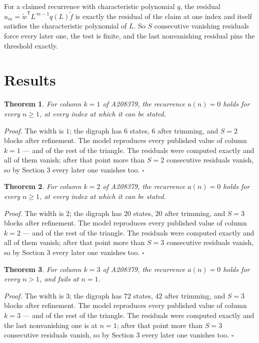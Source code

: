 \documentclass[11pt]{article}
\newtheorem{theorem}{Theorem}
\theoremstyle{definition}
\begin{document}
For a claimed recurrence with characteristic polynomial $q$, the residual $u_m = \tilde w^{\mathsf T}L^{\,m-1}q(L)\tilde f$ is exactly the residual of the claim at one index and itself satisfies the characteristic polynomial of $L$. So $S$ consecutive vanishing residuals force every later one, the test is finite, and the last nonvanishing residual pins the threshold exactly.

\section{Results}

\begin{theorem} For column $k = 1$ of A208379, the recurrence $a(n) = 0$ holds for every $n \ge 1$, at every index at which it can be stated.\end{theorem}

{\itshape Proof.} The width is $1$; the digraph has $6$ states, $6$ after trimming, and $S = 2$ blocks after refinement. The model reproduces every published value of column $k = 1$ --- and of the rest of the triangle. The residuals were computed exactly and all of them vanish; after that point more than $S = 2$ consecutive residuals vanish, so by Section 3 every later one vanishes too. $\square$

\begin{theorem} For column $k = 2$ of A208379, the recurrence $a(n) = 0$ holds for every $n \ge 1$, at every index at which it can be stated.\end{theorem}

{\itshape Proof.} The width is $2$; the digraph has $20$ states, $20$ after trimming, and $S = 3$ blocks after refinement. The model reproduces every published value of column $k = 2$ --- and of the rest of the triangle. The residuals were computed exactly and all of them vanish; after that point more than $S = 3$ consecutive residuals vanish, so by Section 3 every later one vanishes too. $\square$

\begin{theorem} For column $k = 3$ of A208379, the recurrence $a(n) = 0$ holds for every $n > 1$, and fails at $n = 1$.\end{theorem}

{\itshape Proof.} The width is $3$; the digraph has $72$ states, $42$ after trimming, and $S = 3$ blocks after refinement. The model reproduces every published value of column $k = 3$ --- and of the rest of the triangle. The residuals were computed exactly and the last nonvanishing one is at $n = 1$; after that point more than $S = 3$ consecutive residuals vanish, so by Section 3 every later one vanishes too. $\square$
\end{document}

